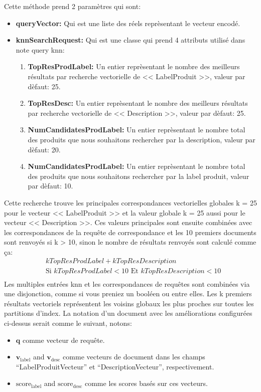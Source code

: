 \noindent
Cette méthode prend 2 paramètres qui sont:
\begin{itemize}
	\item \small\textbf{queryVector: } Qui est une liste des réels reprèsentant le vecteur encodé.
	\item \textbf{knnSearchRequest: } Qui est une classe qui prend 4 attributs utilisé dans note query knn:
	      \begin{enumerate}
		      \item \small\textbf{TopResProdLabel: } Un entier reprèsentant le nombre des meilleurs résultats par recherche vectorielle de << LabelProduit >>, valeur par dèfaut: 25.
		      \item \small\textbf{TopResDesc: } Un entier reprèsentant le nombre des meilleurs résultats par recherche vectorielle de << Description >>, valeur par dèfaut: 25.
		      \item \small\textbf{NumCandidatesProdLabel: } Un entier reprèsentant le nombre total des produits que nous souhaitons rechercher par la description, valeur par dèfaut: 20.
		      \item \small\textbf{NumCandidatesProdLabel: } Un entier reprèsentant le nombre total des produits que nous souhaitons rechercher par la label produit, valeur par dèfaut: 10.
	      \end{enumerate}

\end{itemize}

\noindent
Cette recherche trouve les principales correspondances vectorielles globales k = 25 pour le vecteur << LabelProduit >> et la valeur globale k = 25 aussi pour le vecteur << Description >>. Ces valeurs principales sont ensuite combinées avec les correspondances de la requête de correspondance et les 10 premiers documents sont renvoyés si k > 10, sinon le nombre de résultats renvoyés sont calculé comme ça:\[
	\begin{aligned}
		 & kTopResProdLabel + kTopResDescription                                \\
		 & \text{Si } kTopResProdLabel < 10 \text{ Et } kTopResDescription < 10 \\
	\end{aligned}
\]
Les multiples entrées knn et les correspondances de requêtes sont combinées via une disjonction, comme si vous preniez un booléen ou entre elles. Les k premiers résultats vectoriels représentent les voisins globaux les plus proches sur toutes les partitions d'index.
\noindent
La notation d'un document avec les améliorations configurées ci-dessus serait comme le suivant, notons:
\begin{itemize}
	\item \( \mathbf{q} \) comme vecteur de requête.
	\item \( \mathbf{v}_{\text{label}} \) and \( \mathbf{v}_{\text{desc}} \) comme vecteurs de document dans les champs ``LabelProduitVecteur'' et ``DescriptionVecteur'', respectivement.
	\item \( \text{score}_{\text{label}} \) and \( \text{score}_{\text{desc}} \) comme les scores basés sur ces vecteurs.
\end{itemize}

